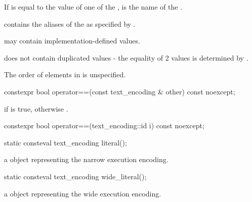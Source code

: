 \documentclass{wg21}
\begin{document}
\begin{addedblock}
\begin{itemdescr}
\pnum If  is equal to the  value of one of the ,  is the name of the .

 contains the aliases of the  as specified by \cite{rfc2978}.

\pnum {} may contain implementation-defined values.

\pnum {} does not contain duplicated values - the equality of 2 values is determined by .

\begin{note}
The order of elements in  is unspecified.
\end{note}

\end{itemdescr}

\begin{itemdecl}
constexpr bool operator==(const text_encoding & other) const noexcept;
\end{itemdecl}

\begin{itemdescr}
\returns
{} if  is true,
otherwise
.
\end{itemdescr}

\begin{itemdecl}
constexpr bool operator==(text_encoding::id i) const noexcept;
\end{itemdecl}

\begin{itemdescr}
\returns {}
\end{itemdescr}

\begin{itemdecl}
static consteval text_encoding literal();
\end{itemdecl}

\begin{itemdescr}
    \returns a  object representing the narrow execution encoding.
\end{itemdescr}

\begin{itemdecl}
static consteval text_encoding wide_literal();
\end{itemdecl}

\begin{itemdescr}
    \returns a  object representing the wide execution encoding.
\end{itemdescr}


\end{addedblock}
\end{document}
